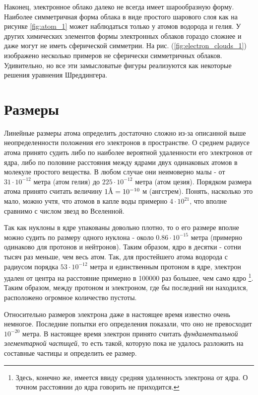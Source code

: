 Наконец, электронное облако далеко не всегда имеет шарообразную форму.
Наиболее симметричная форма облака в виде простого шарового слоя как на рисунке \ref{fig:atom_1} может наблюдаться только у атомов водорода и гелия.
У других химических элементов формы электронных облаков гораздо сложнее и даже могут не иметь сферической симметрии.
На рис. (\ref{fig:electron_clouds_1}) изображено несколько примеров не сферически симметричных облаков.
Удивительно, но все эти замысловатые фигуры реализуются как некоторые решения уравнения Шреддингера.


\section*{Размеры}

Линейные размеры атома определить достаточно сложно из-за описанной выше неопределенности положения его электронов в пространстве.
О среднем радиусе атома принято судить либо по наиболее вероятной удаленности его электронов от ядра, либо по половине расстояния между ядрами двух одинаковых атомов в молекуле простого вещества.
В любом случае они неимоверно малы - от $31\cdot 10^{-12}$ метра (атом гелия) до $225\cdot 10^{-12}$ метра (атом цезия).
Порядком размера атома принято считать величину $1\mbox{\normalfont\AA} = 10^{-10}$ м (ангстрем).
Понять, насколько это мало, можно учтя, что атомов в капле воды примерно $4\cdot 10^{21}$, что вполне сравнимо с числом звезд во Вселенной.

Так как нуклоны в ядре упакованы довольно плотно, то о его размере вполне можно судить по размеру одного нуклона - около $0.86\cdot 10^{-15}$ метра (примерно одинаково для протонов и нейтронов). 
Таким образом, ядро в десятки - сотни тысяч раз меньше, чем весь атом.
Так, для простейшего атома водорода с радиусом порядка $53\cdot 10^{-12}$ метра и единственным протоном в ядре, электрон удален от центра на расстояние примерно в 100000 раз большее, чем само ядро \footnote{%
    Здесь, конечно же, имеется ввиду средняя удаленность электрона от ядра.
    О точном расстоянии до ядра говорить не приходится.}.
Таким образом, между протоном и электроном, где бы последний ни находился, расположено огромное количество пустоты.

Относительно размеров электрона даже в настоящее время известно очень немногое.
Последние попытки его определения показали, что оно не превосходит $10^{-20}$ метра.
В настоящее время электрон принято считать \textit{фундаментальной элементарной частицей}, то есть такой, которую пока не удалось разложить на составные частицы и определить ее размер.

